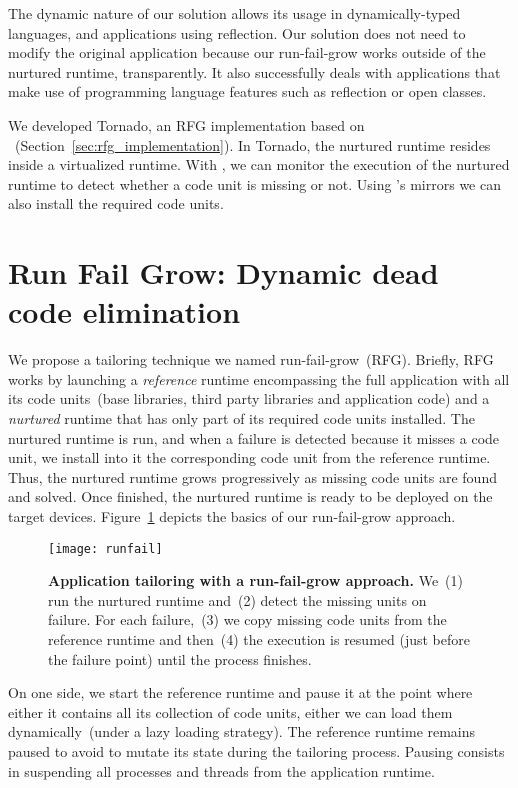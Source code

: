The dynamic nature of our solution allows its usage in dynamically-typed languages, and applications using reflection. Our solution does not need to modify the original application because our run-fail-grow works outside of the nurtured runtime, transparently.
It also successfully deals with applications that make use of programming language features such as reflection or open classes.

We developed Tornado, an RFG implementation based on \Vtt~(Section~\ref{sec:rfg_implementation}). In Tornado, the nurtured runtime resides inside a virtualized runtime. With \Vtt, we can monitor the execution of the nurtured runtime to detect whether a code unit is missing or not. Using \Vtt's mirrors we can also install the required code units.

\section{Run Fail Grow: Dynamic dead code elimination}\label{sec:rfg_model}

We propose a tailoring technique we named run-fail-grow~(RFG). Briefly, RFG works by launching a \emph{reference} runtime encompassing the full application with all its code units~(base libraries, third party libraries and application code) and a \emph{nurtured} runtime that has only part of its required code units installed. The nurtured runtime is run, and when a failure is detected because it misses a code unit, we install into it the corresponding code unit from the reference runtime. Thus, the nurtured runtime grows progressively as missing code units are found and solved.
Once finished, the nurtured runtime is ready to be deployed on the target devices. Figure~\ref{fig:runfail} depicts the basics of our run-fail-grow approach.

\begin{figure}[ht]
\begin{center}
\texttt{[image: runfail]}
\caption{\small \textbf{Application tailoring with a run-fail-grow approach.} We~(1) run the nurtured runtime and~(2) detect the missing units on failure. For each failure,~(3) we copy missing code units from the reference runtime and then~(4) the execution is resumed (just before the failure point) until the process finishes. \label{fig:runfail}}
\end{center}
\end{figure}

On one side, we start the reference runtime and pause it at the point where either it contains all its collection of code units, either we can load them dynamically~(under a lazy loading strategy). The reference runtime remains paused to avoid to mutate its state during the tailoring process. Pausing consists in suspending all processes and threads from the application runtime.


